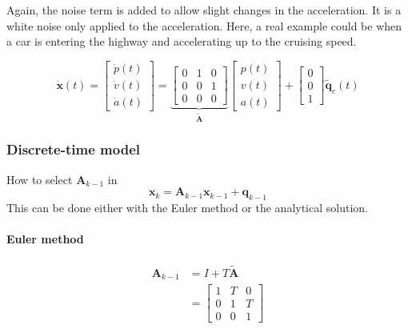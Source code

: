 Again, the noise term is added to allow slight changes in the acceleration. It is a white noise only applied to the acceleration. Here, a real example could be when a car is entering the highway and accelerating up to the cruising speed.

\begin{equation}
    \mathbf{\dot{x}}(t) = 
    \left[ \begin{array}{c}
        \dot{p}(t) \\
        \dot{v}(t) \\
        \dot{a}(t)
    \end{array}\right] = \underbrace{\left[\begin{array}{ccc}
        0 & 1 & 0 \\
        0 & 0 & 1 \\
        0 & 0 & 0
    \end{array}\right]}_{\mathbf{\tilde{A}}} \left[\begin{array}{c}
        p(t) \\
        v(t) \\
        a(t)
    \end{array}\right] + \left[\begin{array}{c}
        0 \\
        0 \\
        1 
    \end{array}\right]\mathbf{\tilde{q}}_c(t)
\end{equation}

\subsubsection{Discrete-time model}
How to select $\mathbf{A}_{k-1}$ in
\begin{equation}
    \mathbf{x}_k = \mathbf{A}_{k-1} \mathbf{x}_{k-1} + \mathbf{q}_{k-1}
\end{equation}
This can be done either with the Euler method or the analytical solution.

\paragraph{Euler method}
\begin{align}
    \mathbf{A}_{k-1} & = I + T \mathbf{\tilde{A}} \\
              &= \left[\begin{array}{ccc}
                  1 & T & 0 \\
                  0 & 1 & T \\
                  0 & 0 & 1
              \end{array}\right]
\end{align}

